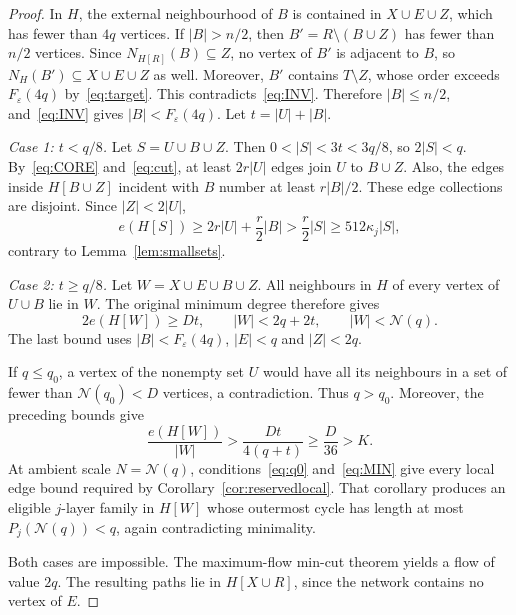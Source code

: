 \documentclass[10pt,a4paper]{amsart}
\newcommand{\eps}{\varepsilon}
\begin{document}
\begin{proof}
In $H$, the external neighbourhood of $B$ is contained in $X\cup E\cup Z$, which has fewer than $4q$ vertices. If $|B|>n/2$, then $B'=R\setminus(B\cup Z)$ has fewer than $n/2$ vertices. Since $N_{H[R]}(B)\subseteq Z$, no vertex of $B'$ is adjacent to $B$, so $N_H(B')\subseteq X\cup E\cup Z$ as well. Moreover, $B'$ contains $T\setminus Z$, whose order exceeds $F_\eps(4q)$ by~\eqref{eq:target}. This contradicts~\eqref{eq:INV}. Therefore $|B|\le n/2$, and~\eqref{eq:INV} gives $|B|<F_\eps(4q)$. Let $t=|U|+|B|$.

\medskip
\noindent\emph{Case 1: $t<q/8$.}
Let $S=U\cup B\cup Z$. Then $0<|S|<3t<3q/8$, so $2|S|<q$. By~\eqref{eq:CORE} and~\eqref{eq:cut}, at least $2r|U|$ edges join $U$ to $B\cup Z$. Also, the edges inside $H[B\cup Z]$ incident with $B$ number at least $r|B|/2$. These edge collections are disjoint. Since $|Z|<2|U|$,
\[
e(H[S])\ge2r|U|+\frac r2|B|
>\frac r2|S|\ge512\kappa_j|S|,
\]
contrary to Lemma~\ref{lem:smallsets}.

\medskip
\noindent\emph{Case 2: $t\ge q/8$.}
Let $W=X\cup E\cup B\cup Z$. All neighbours in $H$ of every vertex of $U\cup B$ lie in $W$. The original minimum degree therefore gives
\[
2e(H[W])\ge Dt,\qquad
|W|<2q+2t,\qquad |W|<\mathcal N(q).
\]
The last bound uses $|B|<F_\eps(4q)$, $|E|<q$ and $|Z|<2q$.

If $q\le q_0$, a vertex of the nonempty set $U$ would have all its neighbours in a set of fewer than $\mathcal N(q_0)<D$ vertices, a contradiction. Thus $q>q_0$. Moreover, the preceding bounds give
\[
\frac{e(H[W])}{|W|}>\frac{Dt}{4(q+t)}\ge\frac D{36}>K.
\]
At ambient scale $N=\mathcal N(q)$, conditions~\eqref{eq:q0} and~\eqref{eq:MIN} give every local edge bound required by Corollary~\ref{cor:reservedlocal}. That corollary produces an eligible $j$-layer family in $H[W]$ whose outermost cycle has length at most $P_j(\mathcal N(q))<q$, again contradicting minimality.

Both cases are impossible. The maximum-flow min-cut theorem yields a flow of value $2q$. The resulting paths lie in $H[X\cup R]$, since the network contains no vertex of $E$.
\end{proof}
\end{document}

